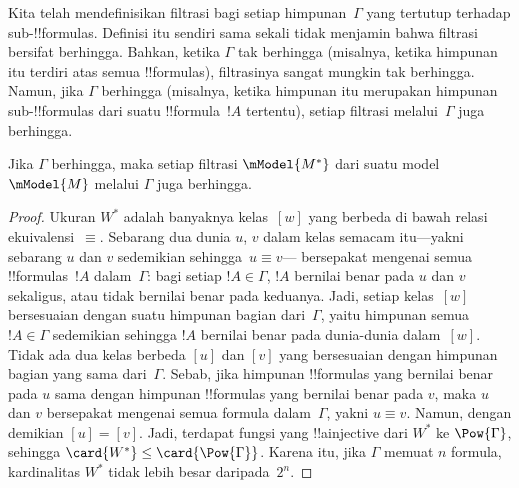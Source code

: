 \documentclass[../../../include/open-logic-section]{subfiles}
\begin{document}


Kita telah mendefinisikan filtrasi bagi setiap himpunan~$\Gamma$ yang tertutup
terhadap sub-!!{formula}s. Definisi itu sendiri sama sekali tidak menjamin
bahwa filtrasi bersifat berhingga. Bahkan, ketika $\Gamma$ tak berhingga
(misalnya, ketika himpunan itu terdiri atas semua !!{formula}s),
filtrasinya sangat mungkin tak berhingga. Namun, jika $\Gamma$ berhingga
(misalnya, ketika himpunan itu merupakan himpunan sub-!!{formula}s dari suatu
!!{formula}~$!A$ tertentu), setiap filtrasi melalui~$\Gamma$ juga berhingga.

\begin{prop}
  Jika $\Gamma$ berhingga, maka setiap filtrasi $\mModel{M^*}$ dari suatu
  model $\mModel{M}$ melalui $\Gamma$ juga berhingga.
\end{prop}

\begin{proof}
  Ukuran $W^*$ adalah banyaknya kelas~$[w]$ yang berbeda di bawah relasi
  ekuivalensi~$\equiv$. Sebarang dua dunia $u$, $v$ dalam kelas semacam
  itu---yakni sebarang $u$ dan $v$ sedemikian sehingga~$u \equiv v$---
  bersepakat mengenai semua !!{formula}s~$!A$ dalam~$\Gamma$: bagi setiap
  $!A \in \Gamma$, $!A$ bernilai benar pada $u$ dan $v$ sekaligus, atau
  tidak bernilai benar pada keduanya. Jadi, setiap kelas~$[w]$ bersesuaian
  dengan suatu himpunan bagian dari~$\Gamma$, yaitu himpunan semua
  $!A \in \Gamma$ sedemikian sehingga $!A$ bernilai benar pada dunia-dunia
  dalam~$[w]$. Tidak ada dua kelas berbeda $[u]$ dan $[v]$ yang bersesuaian
  dengan himpunan bagian
  yang sama dari~$\Gamma$. Sebab, jika himpunan !!{formula}s yang bernilai
  benar pada $u$ sama dengan himpunan !!{formula}s yang bernilai benar pada
  $v$, maka $u$ dan $v$ bersepakat mengenai semua formula dalam~$\Gamma$, yakni
  $u \equiv v$. Namun, dengan demikian $[u] = [v]$. Jadi, terdapat fungsi
  yang !!a{injective} dari $W^*$ ke $\Pow{\Gamma}$, sehingga
  $\card{W^*} \le \card{\Pow{\Gamma}}$. Karena itu, jika $\Gamma$ memuat $n$
  formula, kardinalitas $W^*$ tidak lebih besar daripada~$2^n$.
\end{proof}
\end{document}
